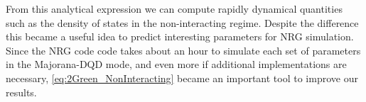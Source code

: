 \documentclass[showpacs,aps,prb,reprint,superscriptaddress]{revtex4-1}
\begin{document}
\noindent From this analytical expression we can compute rapidly dynamical quantities such as the density of states in the non-interacting regime. Despite the difference this became a useful idea to predict interesting parameters for NRG simulation. Since the NRG code  code takes about an hour to simulate each set of parameters in the Majorana-DQD mode, and even more if additional implementations are necessary, \ref{eq:2Green_NonInteracting} became an important tool to improve our results. 






 



\end{document}
